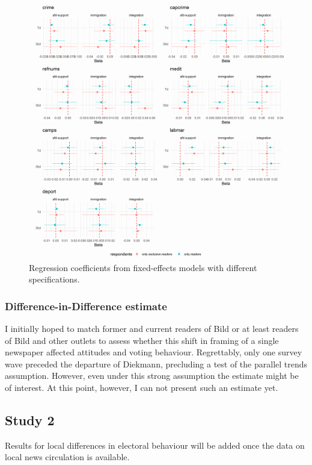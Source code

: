 \documentclass{article}
\begin{document}
\begin{figure}
    \centering
    \includegraphics[width=\textwidth]{paper/vis/effectplot_frames_fe_abs.png}
    \caption{Regression coefficients from fixed-effects models with different specifications.}
    \label{fig:model_fe}
\end{figure}

\subsubsection{Difference-in-Difference estimate}

I initially hoped to match former and current readers of Bild or at least readers of Bild and other outlets to assess whether this shift in framing of a single newspaper affected attitudes and voting behaviour. Regrettably, only one survey wave preceded the departure of Diekmann, precluding a test of the parallel trends assumption. However, even under this strong assumption the estimate might be of interest. At this point, however, I can not present such an estimate yet.

\subsection{Study 2}

Results for local differences in electoral behaviour will be added once the data on local news circulation is available.
\end{document}
